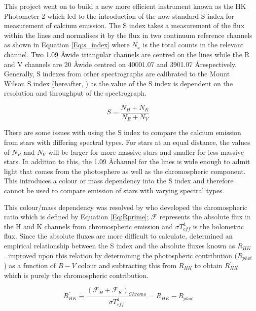 This project went on to build a new more efficient instrument known as the HK Photometer 2 \citep{Vaughan_etal_1978} which led to the introduction of the now standard S index for measurement of calcium emission. The S index takes a measurement of the flux within the \caII lines and normalises it by the flux in two continuum reference channels as shown in Equation \ref{Eq:s_index} where $N_{x}$ is the total counts in the relevant channel. Two 1.09 \AA \space wide triangular channels are centred on the \caII lines while the R and V channels are 20 \AA \space wide centred on 40001.07 and 3901.07 \AA respectively. Generally, S indexes from other spectrographs are calibrated to the Mount Wilson S index (hereafter, \Smw) as the value of the S index is dependent on the resolution and throughput of the spectrograph.

\begin{equation}
    S = \frac{N_{H} + N_{K}}{N_{R} + N_{V}}
    \label{Eq:s_index}
\end{equation}

There are some issues with using the S index to compare the calcium emission from stars with differing spectral types. For stars at an equal distance, the values of $N_{R}$ and $N_{V}$ will be larger for more massive stars and smaller for less massive stars. In addition to this, the 1.09 \AA \space channel for the \caII lines is wide enough to admit light that comes from the photosphere as well as the chromospheric component. This introduces a colour or mass dependency into the S index and therefore cannot be used to compare emission of stars with varying spectral types.

This colour/mass dependency was resolved by \citet{Noyes_etal_1984} who developed the chromospheric ratio \Rprime which is defined by Equation \ref{Eq:Rprime}; $\mathcal{F}$ represents the absolute flux in the H and K channels from chromospheric emission and $\sigma T_{eff}^{4}$ is the bolometric flux. Since the absolute fluxes are more difficult to calculate, \citet{Middelkoop_1982} determined an empirical relationship between the S index and the absolute fluxes known as $R_{HK}$. \citet{Noyes_etal_1984} improved upon this relation by determining the photospheric contribution ($R_{phot}$) as a function of $B-V$ colour and subtracting this from $R_{HK}$ to obtain $R^{'}_{HK}$ which is purely the chromospheric contribution.

\begin{equation}
    R^{'}_{HK} \equiv \frac{(\mathcal{F}_{H} + \mathcal{F}_{K})_{Chromo}}{\sigma T_{eff}^{4}} = R_{HK} - R_{phot}
    \label{Eq:Rprime}
\end{equation}

